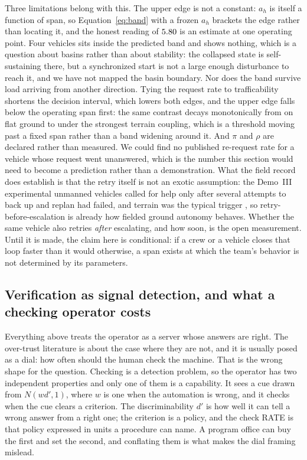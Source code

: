 \documentclass[11pt]{article}
\begin{document}
Three limitations belong with this. The upper edge is not a constant: $a_h$ is itself a function of span, so Equation~\ref{eq:band} with a frozen $a_h$ brackets the edge rather than locating it, and the honest reading of $5.80{}$ is an estimate at one operating point. Four vehicles sits inside the predicted band and shows nothing, which is a question about basins rather than about stability: the collapsed state is self-sustaining there, but a synchronized start is not a large enough disturbance to reach it, and we have not mapped the basin boundary. Nor does the band survive load arriving from another direction. Tying the request rate to trafficability shortens the decision interval, which lowers both edges, and the upper edge falls below the operating span first: the same contrast decays monotonically from \qBandGood{} on flat ground to \qBandGoodHard{} under the strongest terrain coupling, which is a threshold moving past a fixed span rather than a band widening around it. And $\pi$ and $\rho$ are declared rather than measured. We could find no published re-request rate for a vehicle whose request went unanswered, which is the number this section would need to become a prediction rather than a demonstration. What the field record does establish is that the retry itself is not an exotic assumption: the Demo~III experimental unmanned vehicles called for help only after several attempts to back up and replan had failed, and terrain was the typical trigger \citep{schlenoff2006rcs}, so retry-before-escalation is already how fielded ground autonomy behaves. Whether the same vehicle also retries \emph{after} escalating, and how soon, is the open measurement. Until it is made, the claim here is conditional: if a crew or a vehicle closes that loop faster than it would otherwise, a span exists at which the team's behavior is not determined by its parameters.

\subsection{Verification as signal detection, and what a checking operator costs}
\label{subsec:trust}

Everything above treats the operator as a server whose answers are right. The over-trust literature
is about the case where they are not, and it is usually posed as a dial: how often should the human
check the machine. That is the wrong shape for the question. Checking is a detection problem, so the
operator has two independent properties and only one of them is a capability. It sees a cue drawn
from $N(w d', 1)$, where $w$ is one when the automation is wrong, and it checks when the cue clears
a criterion. The discriminability $d'$ is how well it can tell a wrong answer from a right one; the
criterion is a policy, and the check RATE is that policy expressed in units a procedure can name.
A program office can buy the first and set the second, and conflating them is what makes the dial
framing mislead.
\end{document}
